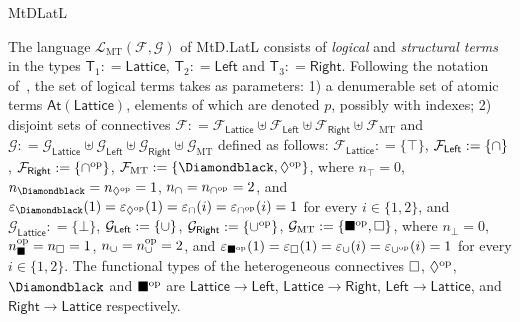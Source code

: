 \begin{entry}{MtDLatL}
\begin{clarifications}
  The language $\mathcal{L}_\mathrm{MT}(\mathcal{F}, \mathcal{G})$ of  MtD.LatL
  consists of  {\em logical}   and {\em structural terms} in the types
  $\mathsf{T}_1:  = \mathsf{Lattice}$, $\mathsf{T}_2: = \mathsf{Left}$ 
  and
  $\mathsf{T}_3: = \mathsf{Right}$. Following the notation of~, the set
  of logical terms takes as parameters: 1) a denumerable set of atomic terms
  $\mathsf{At}(\mathsf{Lattice})$, elements of which are denoted $p$, possibly
  with indexes; 2) disjoint sets of connectives 
  $\mathcal{F}: = \mathcal{F}_{\mathsf{Lattice}}\uplus\mathcal{F}_{\mathsf{Left}}\uplus\mathcal{F}_{\mathsf{Right}}\uplus\mathcal{F}_{\mathrm{MT}}$
  and 
  $\mathcal{G}: = \mathcal{G}_{\mathsf{Lattice}}\uplus\mathcal{G}_{\mathsf{Left}}\uplus\mathcal{G}_{\mathsf{Right}}\uplus\mathcal{G}_{\mathrm{MT}}$
  defined as follows: 
  $\mathcal{F}_{\mathsf{Lattice}}: = \{\top\}$,
  $\mathcal{F}_{\mathsf{Left}}: = \{\cap \}$, 
  $\mathcal{F}_{\mathsf{Right}}: = \{\cap^\mathrm{op} \}$, 
  $\mathcal{F}_{\mathrm{MT}}: = \{\pbdiabp, \diawp\}$, 
  where 
  $n_\top = 0$, 
  $n_{\pbdiabp} =n_{\diawp} = 1$, 
  $n_{\cap} = n_{\cap^\mathrm{op}} = 2$, and
  $\varepsilon_{\pbdiabp}(1) = \varepsilon_{\diawp}(1) = \varepsilon_{\pand}(i) = \varepsilon_{\andp}(i) = 1$ 
  for every $i\in \{1, 2\}$, and
  $\mathcal{G}_{\mathsf{Lattice}}: = \{\bot\}$, 
  $\mathcal{G}_{\mathsf{Left}}: = \{\cup \}$, 
  $\mathcal{G}_{\mathsf{Right}}: = \{\cup^\mathrm{op} \}$, 
  $\mathcal{G}_{\mathrm{MT}}: = \{\blacksquare^\mathrm{op}, \Box\}$, 
  where 
  $n_\bot = 0$, 
  $n_\blacksquare^\mathrm{op} =n_\Box = 1$, 
  $n_\cup = n_\cup^\mathrm{op} = 2$, and 
  $\varepsilon_{\blacksquare^\mathrm{op}}(1) = \varepsilon_{\Box}(1) = \varepsilon_{\cup}(i) = \varepsilon_{\cup^\mathrm{op}}(i) = 1$ 
  for every $i\in \{1, 2\}$.
  The functional types of the heterogeneous connectives $\Box$, $\Diamond^\mathrm{op}$,
  $\pbdiabp$ and $\blacksquare^\mathrm{op}$ are $\mathsf{Lattice}\rightarrow \mathsf{Left}$,
  $\mathsf{Lattice}\rightarrow \mathsf{Right}$, $\mathsf{Left}\rightarrow
  \mathsf{Lattice}$, and  $\mathsf{Right}\rightarrow \mathsf{Lattice}$
  respectively.
  

\end{clarifications}
\end{entry}
